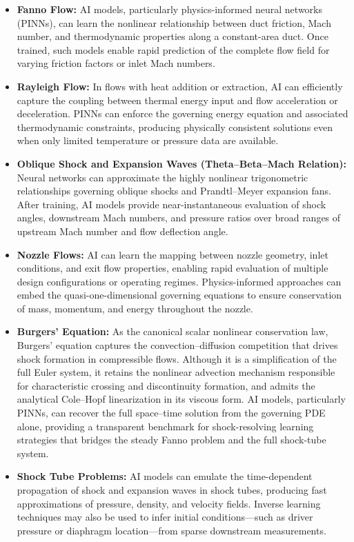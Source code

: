 \documentclass[11pt,a4paper]{report}
\begin{document}
\begin{itemize}
    \item \textbf{Fanno Flow:} AI models, particularly physics-informed neural networks (PINNs), can learn the nonlinear relationship between duct friction, Mach number, and thermodynamic properties along a constant-area duct. Once trained, such models enable rapid prediction of the complete flow field for varying friction factors or inlet Mach numbers.
    
    \item \textbf{Rayleigh Flow:} In flows with heat addition or extraction, AI can efficiently capture the coupling between thermal energy input and flow acceleration or deceleration. PINNs can enforce the governing energy equation and associated thermodynamic constraints, producing physically consistent solutions even when only limited temperature or pressure data are available.
    
    \item \textbf{Oblique Shock and Expansion Waves (Theta--Beta--Mach Relation):} Neural networks can approximate the highly nonlinear trigonometric relationships governing oblique shocks and Prandtl--Meyer expansion fans. After training, AI models provide near-instantaneous evaluation of shock angles, downstream Mach numbers, and pressure ratios over broad ranges of upstream Mach number and flow deflection angle.
    
    \item \textbf{Nozzle Flows:} AI can learn the mapping between nozzle geometry, inlet conditions, and exit flow properties, enabling rapid evaluation of multiple design configurations or operating regimes. Physics-informed approaches can embed the quasi-one-dimensional governing equations to ensure conservation of mass, momentum, and energy throughout the nozzle.
    
    \item \textbf{Burgers' Equation:} As the canonical scalar nonlinear conservation law, Burgers' equation captures the convection--diffusion competition that drives shock formation in compressible flows. Although it is a simplification of the full Euler system, it retains the nonlinear advection mechanism responsible for characteristic crossing and discontinuity formation, and admits the analytical Cole--Hopf linearization in its viscous form. AI models, particularly PINNs, can recover the full space--time solution from the governing PDE alone, providing a transparent benchmark for shock-resolving learning strategies that bridges the steady Fanno problem and the full shock-tube system.
    
    \item \textbf{Shock Tube Problems:} AI models can emulate the time-dependent propagation of shock and expansion waves in shock tubes, producing fast approximations of pressure, density, and velocity fields. Inverse learning techniques may also be used to infer initial conditions---such as driver pressure or diaphragm location---from sparse downstream measurements.
\end{itemize}
\end{document}
